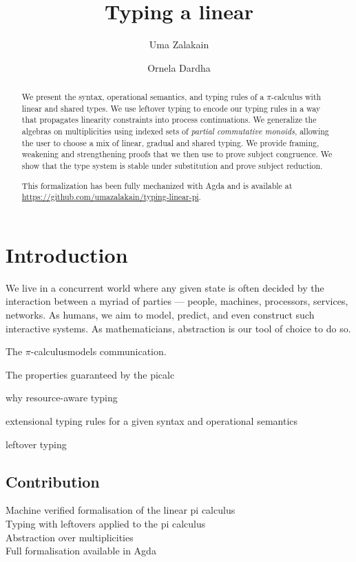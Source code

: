 \documentclass[a4paper,UKenglish,cleveref, autoref, thm-restate,authorcolumns]{lipics-v2019}
\title{Typing a linear \picalc}
\author{Uma Zalakain}{University of Glasgow, Scotland}
       {u.zalakain.1@research.gla.ac.uk}{https://orcid.org/0000-0002-3268-9338}{}
\author{Ornela Dardha}{University of Glasgow, Scotland}
       {ornela.dardha@glasgow.ac.uk}{https://orcid.org/0000-0001-9927-7875}{}
\newcommand{\picalc}{$\pi$-calculus}
\begin{document}
\maketitle
{}

\begin{abstract}
  We present the syntax, operational semantics, and typing rules of a \picalc{} with linear and shared types.
  We use leftover typing \cite{Allais2018a} to encode our typing rules in a way that propagates linearity constraints into process continuations.
  We generalize the algebras on multiplicities using indexed sets of \emph{partial commutative monoids}, allowing the user to choose a mix of linear, gradual and shared typing.
  We provide framing, weakening and strengthening proofs that we then use to prove subject congruence.
  We show that the type system is stable under substitution and prove subject reduction.

  This formalization has been fully mechanized with Agda and is available at \url{https://github.com/umazalakain/typing-linear-pi}.
\end{abstract}

\section{Introduction}

We live in a concurrent world where any given state is often decided by the interaction between a myriad of parties --- people, machines, processors, services, networks.
As humans, we aim to model, predict, and even construct such interactive systems.
As mathematicians, abstraction is our tool of choice to do so.

The \picalc models communication.

The properties guaranteed by the picalc

why resource-aware typing

extensional typing rules for a given syntax and operational semantics

leftover typing

\subsection{Contribution}

\begin{description}
  \item [Machine verified formalisation of the linear pi calculus]

  \item [Typing with leftovers applied to the pi calculus]

  \item [Abstraction over multiplicities]

  \item [Full formalisation available in Agda]
\end{description}
\end{document}
